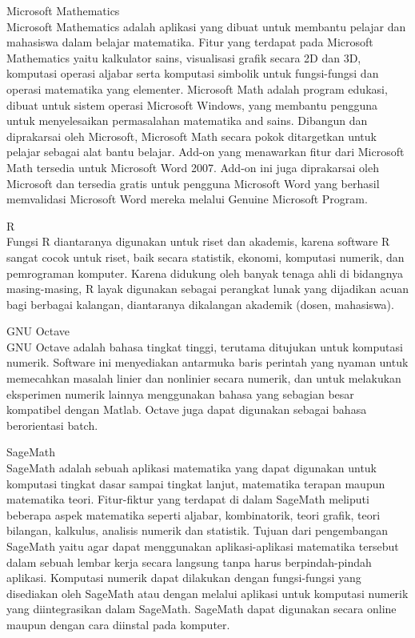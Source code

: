 \documentclass[a4paper,10pt]{article}
\begin{document}
\begin{eulernotebook}
\begin{eulercomment}
Microsoft Mathematics\\
Microsoft Mathematics adalah aplikasi yang dibuat untuk membantu
pelajar dan mahasiswa dalam belajar matematika. Fitur yang terdapat
pada Microsoft Mathematics yaitu kalkulator sains, visualisasi grafik
secara 2D dan 3D, komputasi operasi aljabar serta komputasi simbolik
untuk fungsi-fungsi dan operasi matematika yang elementer. Microsoft
Math adalah program edukasi, dibuat untuk sistem operasi Microsoft
Windows, yang membantu pengguna untuk menyelesaikan permasalahan
matematika and sains. Dibangun dan diprakarsai oleh Microsoft,
Microsoft Math secara pokok ditargetkan untuk pelajar sebagai alat
bantu belajar. Add-on yang menawarkan fitur dari Microsoft Math
tersedia untuk Microsoft Word 2007. Add-on ini juga diprakarsai oleh
Microsoft dan tersedia gratis untuk pengguna Microsoft Word yang
berhasil memvalidasi Microsoft Word mereka melalui Genuine Microsoft
Program.

R\\
Fungsi R diantaranya digunakan untuk riset dan akademis, karena
software R sangat cocok untuk riset, baik secara statistik, ekonomi,
komputasi numerik, dan pemrograman komputer. Karena didukung oleh
banyak tenaga ahli di bidangnya masing-masing, R layak digunakan
sebagai perangkat lunak yang dijadikan acuan bagi berbagai kalangan,
diantaranya dikalangan akademik (dosen, mahasiswa).

GNU Octave\\
GNU Octave adalah bahasa tingkat tinggi, terutama ditujukan untuk
komputasi numerik. Software ini menyediakan antarmuka baris perintah
yang nyaman untuk memecahkan masalah linier dan nonlinier secara
numerik, dan untuk melakukan eksperimen numerik lainnya menggunakan
bahasa yang sebagian besar kompatibel dengan Matlab. Octave juga dapat
digunakan sebagai bahasa berorientasi batch.

SageMath\\
SageMath adalah sebuah aplikasi matematika yang dapat digunakan untuk
komputasi tingkat dasar sampai tingkat lanjut, matematika terapan
maupun matematika teori. Fitur-fiktur yang terdapat di dalam SageMath
meliputi beberapa aspek matematika seperti aljabar, kombinatorik,
teori grafik, teori bilangan, kalkulus, analisis numerik dan
statistik. Tujuan dari pengembangan SageMath yaitu agar dapat
menggunakan aplikasi-aplikasi matematika tersebut dalam sebuah lembar
kerja secara langsung tanpa harus berpindah-pindah aplikasi. Komputasi
numerik dapat dilakukan dengan fungsi-fungsi yang disediakan oleh
SageMath atau dengan melalui aplikasi untuk komputasi numerik yang
diintegrasikan dalam SageMath. SageMath dapat digunakan secara online
maupun dengan cara diinstal pada komputer.


\end{eulercomment}
\end{eulernotebook}
\end{document}
